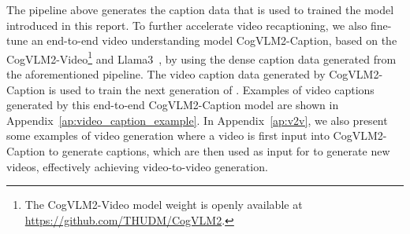  
The pipeline above generates the caption data that is used to trained the \model model introduced in this report. 
To further accelerate video recaptioning, we also fine-tune an end-to-end video understanding model CogVLM2-Caption, based on the CogVLM2-Video\footnote{The CogVLM2-Video model weight is openly available at \url{https://github.com/THUDM/CogVLM2}.} and Llama3~\citep{llama3modelcard}, by using the dense caption data generated from the aforementioned pipeline. 
The video caption data generated by CogVLM2-Caption is used to train the next generation of \model. 
Examples of video captions generated by this end-to-end CogVLM2-Caption model are shown in Appendix~\ref{ap:video_caption_example}. 
In Appendix~\ref{ap:v2v}, we also present some examples of video generation where a video is first input into CogVLM2-Caption to generate captions, which are then used as input for \model to generate new videos, effectively achieving video-to-video generation.



